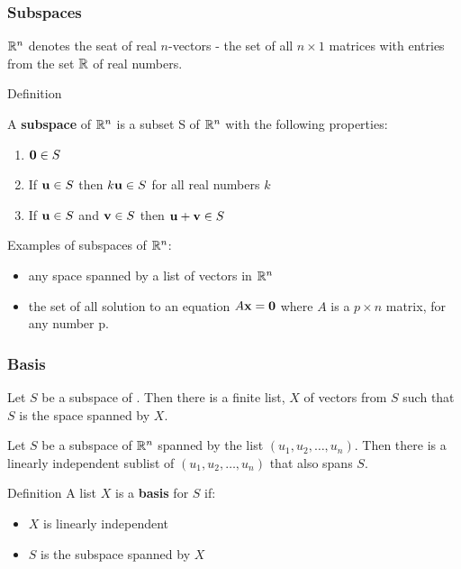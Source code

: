 \documentclass{beamer}
\begin{document}


\begin{frame}
  \frametitle{Subspaces}

$\mathbb{R}^n$  denotes the seat of real $n$-vectors - the set of all $n \times 1$ matrices with entries from the set $\mathbb{R}$ of real numbers.
\medskip

\begin{block}{Definition}

A \textbf{subspace} of $\mathbb{R}^n$ is a subset S of $\mathbb{R}^n$ with the following properties:
\begin{enumerate}
	\item $\mathbf{0} \in S$
	\item If $\mathbf{u} \in S$ then $k\mathbf{u} \in S$ for all real numbers $k$
	\item If $\mathbf{u} \in S$ and  $\mathbf{v} \in S$ then $\mathbf{u} + \mathbf{v} \in S$
\end{enumerate}

\end{block}

Examples of subspaces of $\mathbb{R}^n$:
\begin{itemize}
	\item any space spanned by a list of vectors in $\mathbb{R}^n$
	\item the set of all solution to an equation $A\mathbf{x} = \mathbf{0}$ where $A$ is a $p \times n$ matrix, for any number p.
\end{itemize}

\end{frame}

\begin{frame}
  \frametitle{Basis}

Let $S$ be a subspace of \RealN.  Then there is a finite list, $X$ of vectors from $S$ such that $S$ is the space spanned by $X$.
\medskip

Let $S$ be a subspace of $\mathbb{R}^n$ spanned by the list $(u_1, u_2, \ldots, u_n)$. Then  there is a linearly independent sublist of $(u_1, u_2, \ldots, u_n)$ that also spans $S$.
\medskip

\begin{block}{Definition}
A list $X$ is a \textbf{basis} for $S$ if:
\begin{itemize}
\item $X$ is linearly independent
\item $S$ is the subspace spanned by $X$
\end{itemize}
\end{block}

\end{frame}
\end{document}
